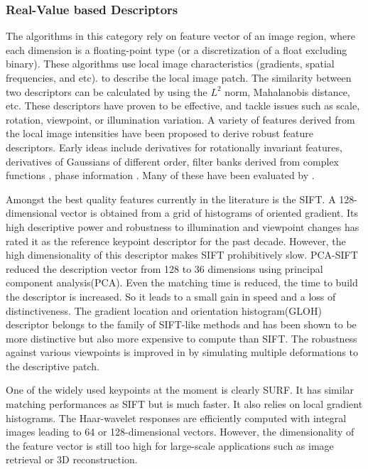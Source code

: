 \subsubsection{Real-Value based Descriptors}
The algorithms in this category rely on feature vector of an image region, where each dimension is a floating-point type (or a discretization of a float excluding binary). These algorithms use local image characteristics (gradients, spatial frequencies, and etc). to describe the local image patch. The similarity between two descriptors can be calculated by using the $L^2$ norm, Mahalanobis distance, etc. These descriptors have proven to be effective, and tackle issues such as scale, rotation, viewpoint, or illumination variation. A variety of features derived from the local image intensities have been proposed to derive robust feature descriptors. Early ideas include derivatives for rotationally invariant features\cite{schmid_local_1997}, derivatives of Gaussians of different order\cite{freeman_design_1991}, filter banks derived from complex functions \cite{schaffalitzky_multi-view_2002}, phase information \cite{carneiro_multi-scale_2003}. Many of these have been evaluated by \cite{mikolajczyk_performance_2005}. 

Amongst the best quality features currently in the literature is the SIFT\cite{lowe_distinctive_2004}. A 128-dimensional vector is obtained from a grid of histograms of oriented gradient. Its high descriptive power and robustness to illumination and viewpoint changes has rated it as the reference keypoint descriptor for the past decade. However, the high dimensionality of this descriptor makes SIFT prohibitively slow. PCA-SIFT\cite{ke_pca-sift:_2004} reduced the description vector from 128 to 36 dimensions using principal component analysis(PCA). Even the matching time is reduced, the time to build the descriptor is increased. So it leads to a small gain in speed and a loss of distinctiveness. The gradient location and orientation histogram(GLOH) descriptor\cite{mikolajczyk_performance_2005} belongs to the family of SIFT-like methods and has been shown to be more distinctive but also more expensive to compute than SIFT.  The robustness against various viewpoints is improved in \cite{yu_fully_2009} by simulating multiple deformations to the descriptive patch.

One of the widely used keypoints at the moment is clearly SURF\cite{bay_speeded-up_2008}. It has similar matching performances as SIFT but is much faster. It also relies on local gradient histograms. The Haar-wavelet responses are efficiently computed with integral images leading to 64 or 128-dimensional vectors. However, the dimensionality of the feature vector is still too high for large-scale applications such as image retrieval or 3D reconstruction.


